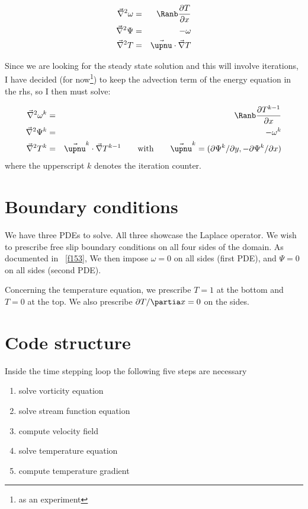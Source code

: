 \begin{eqnarray}
\vec\nabla^2 \omega &=& \Ranb \frac{\partial T}{\partial x} \\
\vec\nabla^2 \Psi   &=&  -\omega \\
\vec\nabla^2 T      &=&  \vec\upnu \cdot \vec\nabla T
\end{eqnarray}

Since we are looking for the steady state 
solution and this will involve iterations, 
I have decided (for now\footnote{as an experiment}) 
to keep the advection term of the 
energy equation in the rhs, so I then must solve: 

\begin{eqnarray}
\vec\nabla^2 \omega^{k} &=& \Ranb \frac{\partial T^{k-1}}{\partial x} \\
\vec\nabla^2 \Psi^{k}   &=&  -\omega^{k} \\
\vec\nabla^2 T^k        &=& \vec\upnu^k \cdot \vec\nabla T^{k-1}
\qquad \text{with} \qquad 
\vec\upnu^k=(\partial \Psi^k/\partial y,-\partial \Psi^k / \partial x)
\end{eqnarray}
where the upperscript $k$ denotes the iteration counter.

\section*{Boundary conditions}

We have three PDEs to solve. All three showcase the 
Laplace operator. We wish to prescribe free slip 
boundary conditions on all four sides of the domain. 
As documented in \stone~\ref{f153}, 
We then impose $\omega=0$ on all sides (first PDE), 
and $\Psi=0$ on all sides (second PDE). 

Concerning the temperature equation, 
we prescribe $T=1$ at the bottom and $T=0$ at the top. 
We also prescribe $\partial T/\partia x=0$ on the sides.


\section*{Code structure}


Inside the time stepping loop the following five steps are necessary
\begin{enumerate}
\item solve vorticity equation
\item solve stream function equation
\item compute velocity field
\item solve temperature equation
\item compute temperature gradient
\end{enumerate}


